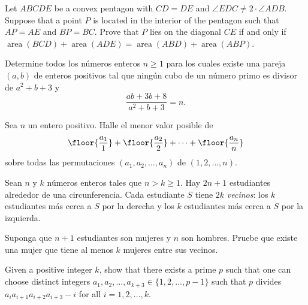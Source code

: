 \begin{probMG}[ISL 2019/G5]
	Let $ABCDE$ be a convex pentagon with $CD=DE$ and $\angle EDC\ne 2\cdot\angle ADB$. Suppose that a point $P$ is located in the interior of the pentagon such that $AP=AE$ and $BP=BC$. Prove that $P$ lies on the diagonal $CE$ if and only if $\operatorname{area}(BCD)+\operatorname{area}(ADE)=\operatorname{area}(ABD)+\operatorname{area}(ABP)$.
\end{probMG}


\begin{probEG}
	Determine todos los números enteros $n\ge 1$ para los cuales existe una pareja $(a,b)$ de enteros positivos tal que ningún cubo de un número primo es divisor de $a^2+b+3$ y
	\[\frac{ab+3b+8}{a^2+b+3}=n.\]
\end{probEG}

\begin{probEG}
	Sea $n$ un entero positivo. Halle el menor valor posible de
	\[\floor{\frac{a_1}{1}}+\floor{\frac{a_2}{2}}+\dots+\floor{\frac{a_n}{n}}\]
	sobre todas las permutaciones $(a_1,a_2,\dots,a_n)$ de $(1,2,\dots,n)$.
\end{probEG}

\begin{probH}
	Sean $n$ y $k$ números enteros tales que $n>k\ge 1$. Hay $2n+1$ estudiantes alrededor de una circunferencia. Cada estudiante $S$ tiene $2k$ \emph{vecinos}: los $k$ estudiantes más cerca a $S$ por la derecha y los $k$ estudiantes más cerca a $S$ por la izquierda.

	Suponga que $n+1$ estudiantes son mujeres y $n$ son hombres. Pruebe que existe una mujer que tiene al menos $k$ mujeres entre sus vecinos.
\end{probH}


\begin{probEG}[ISL 2020/N1]
	Given a positive integer $k$, show that there exists a prime $p$ such that one can choose distinct integers $a_1,a_2,\dots,a_{k+3}\in\{1,2,\dots,p-1\}$ such that $p$ divides $a_ia_{i+1}a_{i+2}a_{i+3}-i$ for all $i=1,2,\dots,k$.
\end{probEG}

